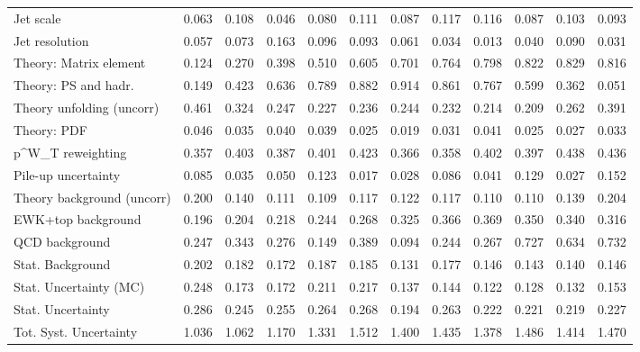 \begin{tabular}{l|p{0.6cm}p{0.6cm}p{0.6cm}p{0.6cm}p{0.6cm}p{0.6cm}p{0.6cm}p{0.6cm}p{0.6cm}p{0.6cm}p{0.6cm}}
Jet scale                                & 0.063 & 0.108 & 0.046 & 0.080 & 0.111 & 0.087 & 0.117 & 0.116 & 0.087 & 0.103 & 0.093 \\
Jet resolution                           & 0.057 & 0.073 & 0.163 & 0.096 & 0.093 & 0.061 & 0.034 & 0.013 & 0.040 & 0.090 & 0.031 \\
Theory: Matrix element                   & 0.124 & 0.270 & 0.398 & 0.510 & 0.605 & 0.701 & 0.764 & 0.798 & 0.822 & 0.829 & 0.816 \\
Theory: PS and hadr.                     & 0.149 & 0.423 & 0.636 & 0.789 & 0.882 & 0.914 & 0.861 & 0.767 & 0.599 & 0.362 & 0.051 \\
Theory unfolding (uncorr)                & 0.461 & 0.324 & 0.247 & 0.227 & 0.236 & 0.244 & 0.232 & 0.214 & 0.209 & 0.262 & 0.391 \\
Theory: PDF                              & 0.046 & 0.035 & 0.040 & 0.039 & 0.025 & 0.019 & 0.031 & 0.041 & 0.025 & 0.027 & 0.033 \\
p^{W}_{T} reweighting                    & 0.357 & 0.403 & 0.387 & 0.401 & 0.423 & 0.366 & 0.358 & 0.402 & 0.397 & 0.438 & 0.436 \\
Pile-up uncertainty                      & 0.085 & 0.035 & 0.050 & 0.123 & 0.017 & 0.028 & 0.086 & 0.041 & 0.129 & 0.027 & 0.152 \\
Theory background (uncorr)               & 0.200 & 0.140 & 0.111 & 0.109 & 0.117 & 0.122 & 0.117 & 0.110 & 0.110 & 0.139 & 0.204 \\
EWK+top background                       & 0.196 & 0.204 & 0.218 & 0.244 & 0.268 & 0.325 & 0.366 & 0.369 & 0.350 & 0.340 & 0.316 \\
QCD background                           & 0.247 & 0.343 & 0.276 & 0.149 & 0.389 & 0.094 & 0.244 & 0.267 & 0.727 & 0.634 & 0.732 \\
Stat. Background                         & 0.202 & 0.182 & 0.172 & 0.187 & 0.185 & 0.131 & 0.177 & 0.146 & 0.143 & 0.140 & 0.146 \\
Stat. Uncertainty (MC)                   & 0.248 & 0.173 & 0.172 & 0.211 & 0.217 & 0.137 & 0.144 & 0.122 & 0.128 & 0.132 & 0.153 \\
\hline
Stat. Uncertainty                        & 0.286 & 0.245 & 0.255 & 0.264 & 0.268 & 0.194 & 0.263 & 0.222 & 0.221 & 0.219 & 0.227 \\
\hline
Tot. Syst. Uncertainty                   & 1.036 & 1.062 & 1.170 & 1.331 & 1.512 & 1.400 & 1.435 & 1.378 & 1.486 & 1.414 & 1.470 \\
\hline
\end{tabular}
